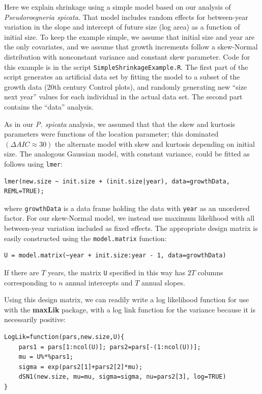 \documentclass[11pt]{article}
\begin{document}
{Here we explain shrinkage using a simple model based on our analysis of \emph{Pseudoroegneria spicata}. 
That model includes random effects for between-year variation in the slope and intercept of future size 
(log area) as a function of initial size. To keep the example simple, we assume that initial size 
and year are the only covariates, and we assume that growth increments 
follow a skew-Normal distribution with nonconstant variance and constant skew parameter. 
Code for this example is in the script \texttt{SimpleShrinkageExample.R}. The first part of the script generates
an artificial data set by fitting the model to a subset of the growth data (20th century Control plots), and
randomly generating new ``size next year'' values for each individual in the actual data set. 
The second part contains the ``data'' analysis. 

As in our \emph{P. spicata} analysis, we assumed that that the skew and kurtosis parameters were functions
of the location parameter; this dominated $(\Delta AIC \approx 30)$ the alternate 
model with skew and kurtosis depending on initial size.   
The analogous Gaussian model, with constant variance, could be fitted as follows using \texttt{lmer}:
\begin{lstlisting}
lmer(new.size ~ init.size + (init.size|year), data=growthData, REML=TRUE); 
\end{lstlisting}
where \texttt{growthData} is a data frame holding the data with \texttt{year} as an unordered factor. For our skew-Normal
model, we instead use maximum likelihood with all between-year variation included as fixed effects. The appropriate design
matrix is easily constructed using the \texttt{model.matrix} function: 
\begin{lstlisting}
U = model.matrix(~year + init.size:year - 1, data=growthData)
\end{lstlisting}
If there are $T$ years, the matrix \texttt{U} specified in this way has $2T$ columns corresponding to $n$ annual 
intercepts and $T$ annual slopes. 

Using this design matrix, we can readily write a log likelihood function for use with 
the \textbf{maxLik} package, with a log link function for the variance because it is necessarily positive: 
\begin{lstlisting}
LogLik=function(pars,new.size,U){
    pars1 = pars[1:ncol(U)]; pars2=pars[-(1:ncol(U))];
    mu = U%*%pars1;  
    sigma = exp(pars2[1]+pars2[2]*mu);
    dSN1(new.size, mu=mu, sigma=sigma, nu=pars2[3], log=TRUE)
}
\end{lstlisting} 

}
\end{document}
